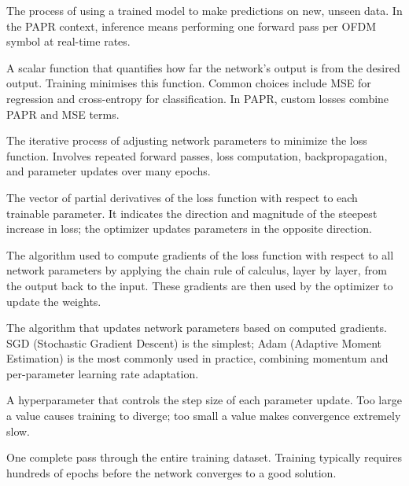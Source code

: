 \begin{description}[style=nextline, font=\normalfont\bfseries, leftmargin=1.5em]
      \item[Inference]
            The process of using a trained model to make predictions on new, unseen data. In the PAPR context, inference means performing one forward pass per OFDM symbol at real-time rates.

      \item[Loss Function]
            A scalar function that quantifies how far the network's output is from the desired output. Training minimises this function. Common choices include MSE for regression and cross-entropy for classification. In PAPR, custom losses combine PAPR and MSE terms.

      \item[Training]
            The iterative process of adjusting network parameters to minimize the loss function. Involves repeated forward passes, loss computation, backpropagation, and parameter updates over many epochs.

      \item[Gradient]
            The vector of partial derivatives of the loss function with respect to each trainable parameter. It indicates the direction and magnitude of the steepest increase in loss; the optimizer updates parameters in the opposite direction.

      \item[Backpropagation]
            The algorithm used to compute gradients of the loss function with respect to all network parameters by applying the chain rule of calculus, layer by layer, from the output back to the input. These gradients are then used by the optimizer to update the weights.

      \item[Optimizer]
            The algorithm that updates network parameters based on computed gradients. SGD (Stochastic Gradient Descent) is the simplest; Adam (Adaptive Moment Estimation) is the most commonly used in practice, combining momentum and per-parameter learning rate adaptation.

      \item[Learning Rate ($\eta$)]
            A hyperparameter that controls the step size of each parameter update. Too large a value causes training to diverge; too small a value makes convergence extremely slow.

      \item[Epoch]
            One complete pass through the entire training dataset. Training typically requires hundreds of epochs before the network converges to a good solution.


\end{description}
